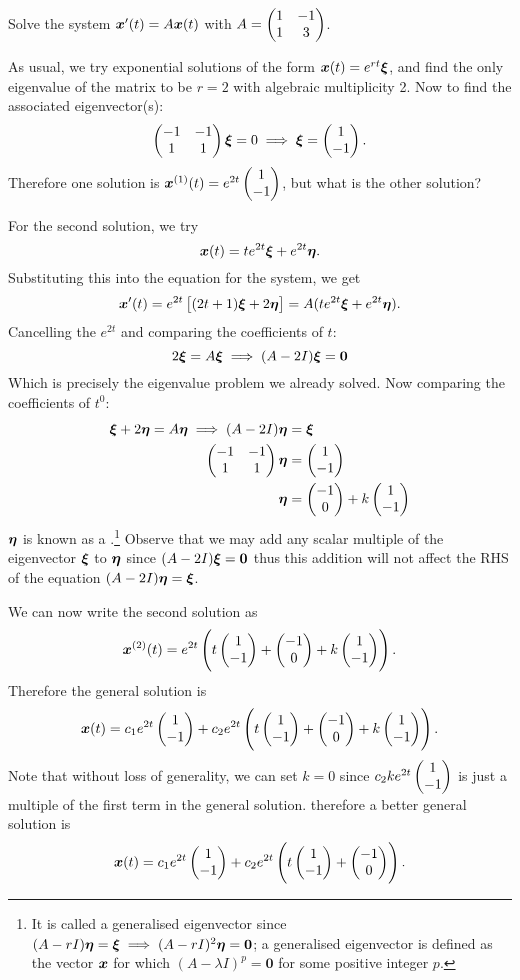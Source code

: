 \begin{eg}\label{eg:repeigs}
	Solve the system $\bm{x}'(t) = A\bm{x}(t)$ with $A = \begin{pmatrix}1 & -1 \\ 1 & 3\end{pmatrix}$.
	
	As usual, we try exponential solutions of the form $\bm{x}(t) = e^{rt}\bm{\xi}$, and find the only eigenvalue of the matrix to be $r=2$ with algebraic multiplicity 2. Now to find the associated eigenvector(s):
	\[
	\begin{pmatrix}-1 & -1 \\ 1 & 1\end{pmatrix}\bm{\xi} = 0 \implies \bm{\xi} = \begin{pmatrix}1 \\ -1\end{pmatrix}.
	\]
	Therefore one solution is $\bm{x}^{(1)}(t) = e^{2t}\begin{pmatrix}1 \\ -1\end{pmatrix}$, but what is the other solution?
	
	For the second solution, we try
	\[
	\bm{x}(t) = te^{2t}\bm{\xi} + e^{2t}\bm{\eta}.
	\]
	Substituting this into the equation for the system, we get
	\[
	\bm{x}'(t) = e^{2t}\left[(2t+1)\bm{\xi} + 2\bm{\eta}\right] = A(te^{2t}\bm{\xi} + e^{2t}\bm{\eta}).
	\]
	Cancelling the $e^{2t}$ and comparing the coefficients of $t$:
	\[
	2\bm{\xi} = A\bm{\xi} \implies (A-2I) \bm{\xi} = \bm{0}
	\]
	Which is precisely the eigenvalue problem we already solved. Now comparing the coefficients of $t^0$:
	\begin{align*}
		\bm{\xi} + 2\bm{\eta} = A\bm{\eta} \implies (A-2I)\bm{\eta} &= \bm{\xi} \\ \begin{pmatrix}-1 & -1 \\ 1 & 1\end{pmatrix}\bm{\eta} &= \begin{pmatrix}1 \\ -1\end{pmatrix} \\
		\bm{\eta} &= \begin{pmatrix}-1 \\ 0\end{pmatrix} + k\begin{pmatrix}1 \\ -1\end{pmatrix}
	\end{align*}
	$\bm{\eta}$ is known as a .\footnote{It is called a generalised eigenvector since $(A-rI)\bm{\eta} = \bm{\xi} \implies (A-rI)^2\bm{\eta} = \bm{0}$; a generalised eigenvector is defined as the vector $\bm{x}$ for which $(A-\lambda I)^p = \bm{0}$ for some positive integer $p$.} Observe that we may add any scalar multiple of the eigenvector $\bm{\xi}$ to $\bm{\eta}$ since $(A-2I)\bm{\xi} = \bm{0}$ thus this addition will not affect the RHS of the equation $(A-2I)\bm{\eta} = \bm{\xi}$.
	
	We can now write the second solution as
	\[
	\bm{x}^{(2)}(t) = e^{2t}\left(t\begin{pmatrix}1 \\ -1\end{pmatrix} + \begin{pmatrix}-1 \\ 0\end{pmatrix} + k\begin{pmatrix}1 \\ -1\end{pmatrix}\right).
	\]
	Therefore the general solution is
	\[
	\bm{x}(t) = c_1 e^{2t}\begin{pmatrix}1 \\ -1\end{pmatrix} + c_2 e^{2t}\left(t\begin{pmatrix}1 \\ -1\end{pmatrix} + \begin{pmatrix}-1 \\ 0\end{pmatrix} + k\begin{pmatrix}1 \\ -1\end{pmatrix}\right).
	\]
	Note that without loss of generality, we can set $k=0$ since $c_2 k e^{2t}\begin{pmatrix}1 \\ -1\end{pmatrix}$ is just a multiple of the first term in the general solution. therefore a better general solution is
	\[
	\bm{x}(t) = c_1 e^{2t}\begin{pmatrix}1 \\ -1\end{pmatrix} + c_2 e^{2t}\left(t\begin{pmatrix}1 \\ -1\end{pmatrix} + \begin{pmatrix}-1 \\ 0\end{pmatrix}\right).
	\]
\end{eg}

